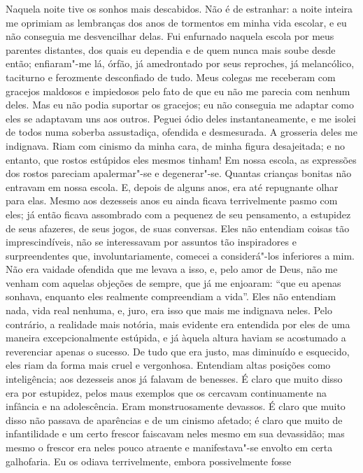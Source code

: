 Naquela noite tive os sonhos mais descabidos. Não é de estranhar: a
noite inteira me oprimiam as lembranças dos anos de tormentos em minha
vida escolar, e eu não conseguia me desvencilhar delas. Fui enfurnado
naquela escola por meus parentes distantes, dos quais eu dependia e de
quem nunca mais soube desde então; enfiaram"-me lá, órfão, já
amedrontado por seus reproches, já melancólico, taciturno e ferozmente
desconfiado de tudo. Meus colegas me receberam com gracejos maldosos e
impiedosos pelo fato de que eu não me parecia com nenhum deles. Mas eu
não podia suportar os gracejos; eu não conseguia me adaptar como eles
se adaptavam uns aos outros. Peguei ódio deles instantaneamente, e me
isolei de todos numa soberba assustadiça, ofendida e desmesurada. A
grosseria deles me indignava. Riam com cinismo da minha cara, de minha
figura desajeitada; e no entanto, que rostos estúpidos eles mesmos
tinham! Em nossa escola, as expressões dos rostos pareciam apalermar"-se
e degenerar"-se. Quantas crianças bonitas não entravam em nossa escola.
E, depois de alguns anos, era até repugnante olhar para elas. Mesmo aos
dezesseis anos eu ainda ficava terrivelmente pasmo com eles; já então
ficava assombrado com a pequenez de seu pensamento, a estupidez de seus
afazeres, de seus jogos, de suas conversas. Eles não entendiam coisas
tão imprescindíveis, não se interessavam por assuntos tão inspiradores
e surpreendentes que, involuntariamente, comecei a considerá"-los
inferiores a mim. Não era vaidade ofendida que me levava a isso, e,
pelo amor de Deus, não me venham com aquelas objeções de sempre, que já
me enjoaram: “que eu apenas sonhava, enquanto eles realmente
compreendiam a vida”. Eles não entendiam nada, vida real nenhuma, e,
juro, era isso que mais me indignava neles. Pelo contrário, a realidade
mais notória, mais evidente era entendida por eles de uma maneira
excepcionalmente estúpida, e já àquela altura haviam se acostumado a
reverenciar apenas o sucesso. De tudo que era justo, mas diminuído e
esquecido, eles riam da forma mais cruel e vergonhosa. Entendiam altas
posições como inteligência; aos dezesseis anos já falavam de benesses.
É claro que muito disso era por estupidez, pelos maus exemplos que os
cercavam continuamente na infância e na adolescência. Eram
monstruosamente devassos. É claro que muito disso não passava de
aparências e de um cinismo afetado; é claro que muito de infantilidade
e um certo frescor faiscavam neles mesmo em sua devassidão; mas mesmo o
frescor era neles pouco atraente e manifestava"-se envolto em certa
galhofaria. Eu os odiava terrivelmente, embora possivelmente fosse
